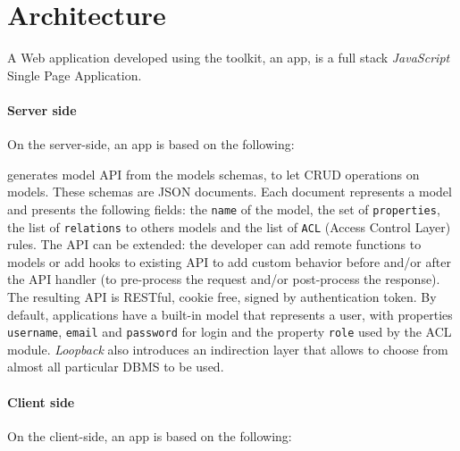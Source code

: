 \section{Architecture}\label{sec:architecture}

A Web application developed using the  toolkit, an  app, is a full stack {\em JavaScript} Single Page Application.

\paragraph{Server side}

On the server-side, an  app is based on the following:

\begin{description}
\itemsep1pt\parskip0pt
\item[StrongLoop LoopBack] generates model API from the models schemas, to let CRUD operations on models.
These schemas are JSON documents. Each document represents a model and presents the following fields: the \texttt{name} of the model, the set of \texttt{properties}, the list of \texttt{relations} to others models and the list of \texttt{ACL} (Access Control Layer) rules. 
The API can be extended: the developer can add remote functions to models or add hooks to existing API to add custom behavior before and/or after the API handler (to pre-process the request and/or post-process the response). 
The resulting API is RESTful, cookie free, signed by authentication token.
By default, applications have a built-in model that represents a user, with properties \texttt{username}, \texttt{email} and \texttt{password} for login and the property \texttt{role} used by the ACL module.
{\em Loopback} also introduces an indirection layer that allows to choose from almost all particular DBMS to be used.
\end{description}

\paragraph{Client side}

On the client-side, an  app is based on the following:

